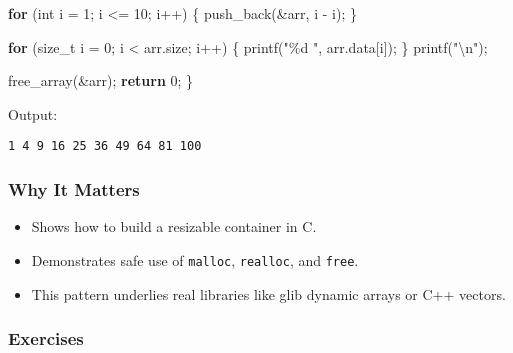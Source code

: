 \documentclass[
  letterpaper,
  DIV=11,
  numbers=noendperiod]{scrreprt}
\newenvironment{Shaded}{\begin{snugshade}}{\end{snugshade}}
\newcommand{\ControlFlowTok}[1]{\textcolor[rgb]{0.00,0.23,0.31}{\textbf{#1}}}
\newcommand{\DataTypeTok}[1]{\textcolor[rgb]{0.68,0.00,0.00}{#1}}
\newcommand{\DecValTok}[1]{\textcolor[rgb]{0.68,0.00,0.00}{#1}}
\newcommand{\NormalTok}[1]{\textcolor[rgb]{0.00,0.23,0.31}{#1}}
\newcommand{\OperatorTok}[1]{\textcolor[rgb]{0.37,0.37,0.37}{#1}}
\newcommand{\SpecialCharTok}[1]{\textcolor[rgb]{0.37,0.37,0.37}{#1}}
\newcommand{\StringTok}[1]{\textcolor[rgb]{0.13,0.47,0.30}{#1}}
\providecommand{\tightlist}{%
  \setlength{\itemsep}{0pt}\setlength{\parskip}{0pt}}
\begin{document}
\begin{Shaded}
\begin{Highlighting}[]
    \ControlFlowTok{for} \OperatorTok{(}\DataTypeTok{int}\NormalTok{ i }\OperatorTok{=} \DecValTok{1}\OperatorTok{;}\NormalTok{ i }\OperatorTok{\textless{}=} \DecValTok{10}\OperatorTok{;}\NormalTok{ i}\OperatorTok{++)} \OperatorTok{\{}
\NormalTok{        push\_back}\OperatorTok{(\&}\NormalTok{arr}\OperatorTok{,}\NormalTok{ i }\OperatorTok{{-}}\NormalTok{ i}\OperatorTok{);}
    \OperatorTok{\}}

    \ControlFlowTok{for} \OperatorTok{(}\DataTypeTok{size\_t}\NormalTok{ i }\OperatorTok{=} \DecValTok{0}\OperatorTok{;}\NormalTok{ i }\OperatorTok{\textless{}}\NormalTok{ arr}\OperatorTok{.}\NormalTok{size}\OperatorTok{;}\NormalTok{ i}\OperatorTok{++)} \OperatorTok{\{}
\NormalTok{        printf}\OperatorTok{(}\StringTok{"}\SpecialCharTok{\%d}\StringTok{ "}\OperatorTok{,}\NormalTok{ arr}\OperatorTok{.}\NormalTok{data}\OperatorTok{[}\NormalTok{i}\OperatorTok{]);}
    \OperatorTok{\}}
\NormalTok{    printf}\OperatorTok{(}\StringTok{"}\SpecialCharTok{\textbackslash{}n}\StringTok{"}\OperatorTok{);}

\NormalTok{    free\_array}\OperatorTok{(\&}\NormalTok{arr}\OperatorTok{);}
    \ControlFlowTok{return} \DecValTok{0}\OperatorTok{;}
\OperatorTok{\}}
\end{Highlighting}
\end{Shaded}

Output:

\begin{verbatim}
1 4 9 16 25 36 49 64 81 100
\end{verbatim}

\subsubsection{Why It Matters}\label{why-it-matters-43}

\begin{itemize}
\tightlist
\item
  Shows how to build a resizable container in C.
\item
  Demonstrates safe use of \texttt{malloc}, \texttt{realloc}, and
  \texttt{free}.
\item
  This pattern underlies real libraries like glib dynamic arrays or C++
  vectors.
\end{itemize}

\subsubsection{Exercises}\label{exercises-44}
\end{document}
